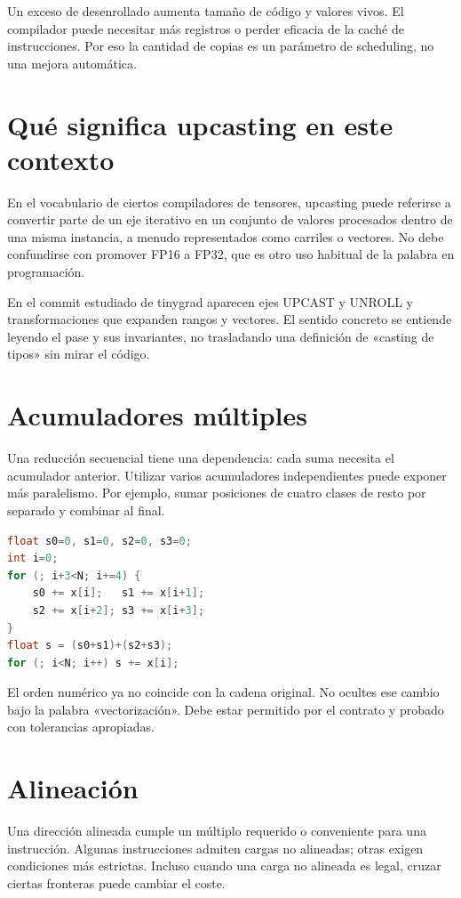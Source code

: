 \documentclass[12pt,a4paper,oneside]{report}
\begin{document}
Un exceso de desenrollado aumenta tamaño de código y valores vivos. El compilador puede necesitar más registros o perder eficacia de la caché de instrucciones. Por eso la cantidad de copias es un parámetro de scheduling, no una mejora automática.

\section{Qué significa upcasting en este contexto}
En el vocabulario de ciertos compiladores de tensores, upcasting puede referirse a convertir parte de un eje iterativo en un conjunto de valores procesados dentro de una misma instancia, a menudo representados como carriles o vectores. No debe confundirse con promover FP16 a FP32, que es otro uso habitual de la palabra en programación.

En el commit estudiado de tinygrad aparecen ejes UPCAST y UNROLL y transformaciones que expanden rangos y vectores. El sentido concreto se entiende leyendo el pase y sus invariantes, no trasladando una definición de «casting de tipos» sin mirar el código. \cite{tinygrad-codegen}

\section{Acumuladores múltiples}
Una reducción secuencial tiene una dependencia: cada suma necesita el acumulador anterior. Utilizar varios acumuladores independientes puede exponer más paralelismo. Por ejemplo, sumar posiciones de cuatro clases de resto por separado y combinar al final.

\begin{lstlisting}[language=C]
float s0=0, s1=0, s2=0, s3=0;
int i=0;
for (; i+3<N; i+=4) {
    s0 += x[i];   s1 += x[i+1];
    s2 += x[i+2]; s3 += x[i+3];
}
float s = (s0+s1)+(s2+s3);
for (; i<N; i++) s += x[i];
\end{lstlisting}
El orden numérico ya no coincide con la cadena original. No ocultes ese cambio bajo la palabra «vectorización». Debe estar permitido por el contrato y probado con tolerancias apropiadas.

\section{Alineación}
Una dirección alineada cumple un múltiplo requerido o conveniente para una instrucción. Algunas instrucciones admiten cargas no alineadas; otras exigen condiciones más estrictas. Incluso cuando una carga no alineada es legal, cruzar ciertas fronteras puede cambiar el coste.
\end{document}

